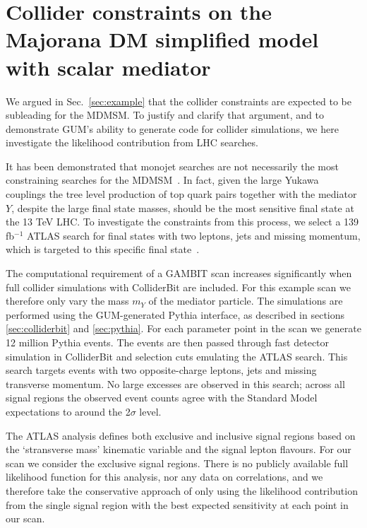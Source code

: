 \documentclass[pdftex,twocolumn,epjc3_preprint,runningheads]{svjour3}
\renewcommand{\_}{\discretionary{\underscore}{}{\underscore}}
\newcommand{\gambit}{\textsf{GAMBIT}\xspace}
\newcommand{\colliderbit}{\textsf{ColliderBit}\xspace}
\newcommand{\pythia}{\textsf{Pythia}\xspace}
\newcommand{\gum}{\textsf{GUM}\xspace}
\begin{document}
\appendix
\setcounter{table}{0}
\renewcommand\thetable{A\arabic{table}}
\renewcommand\thetocsection{\Alph{section}}

\section{Collider constraints on the Majorana DM simplified model with scalar mediator}
\label{app:collider_validation}

We argued in Sec.\ \ref{sec:example} that the collider constraints are expected to be subleading for the MDMSM. To justify and clarify that argument, and to demonstrate \gum's ability to generate code for collider simulations, we here investigate the likelihood contribution from LHC searches.

It has been demonstrated  that monojet searches are not necessarily the most constraining searches for the MDMSM~\cite{Buckley:2014fba, ATLAS:2021shl}. In fact, given the large Yukawa couplings the tree level production of top quark pairs together with the mediator $Y$, despite the large final state masses, should be the most sensitive final state at the 13 TeV LHC.
To investigate the constraints from this process, we select a 139 fb$^{-1}$ ATLAS search for final states with two leptons, jets and missing momentum, which is targeted to this specific final state~\cite{2102.01444}.

The computational requirement of a \gambit scan increases significantly when full collider simulations with \colliderbit are included. For this example scan we therefore only vary the mass $m_Y$ of the mediator particle. The simulations are performed using the \gum-generated \pythia interface, as described in sections \ref{sec:colliderbit} and \ref{sec:pythia}. For each parameter point in the scan we generate 12 million \pythia events. The events are then passed through fast detector simulation in \colliderbit and selection cuts emulating the ATLAS search. This search targets events with two opposite-charge leptons, jets and missing transverse momentum. No large excesses are observed in this search; across all signal regions the observed event counts agree with the Standard Model expectations to around the 2$\sigma$ level.

The ATLAS analysis defines both exclusive and inclusive signal regions based on the `stransverse mass' kinematic variable and the signal lepton flavours. For our scan we consider the exclusive signal regions. There is no publicly available full likelihood function for this analysis, nor any data on correlations, and we therefore take the conservative approach of only using the likelihood contribution from the single signal region with the best expected sensitivity at each point in our scan.
\end{document}
